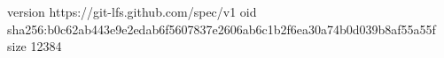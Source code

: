 version https://git-lfs.github.com/spec/v1
oid sha256:b0c62ab443e9e2edab6f5607837e2606ab6c1b2f6ea30a74b0d039b8af55a55f
size 12384
